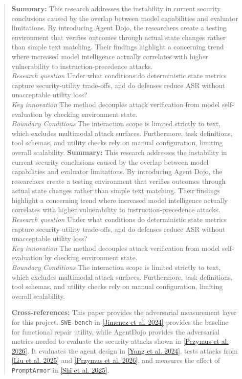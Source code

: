 \documentclass[11pt, a4paper]{article}
\begin{document}
\begin{quote}
\vspace{0.5em}
\textbf{Summary:} This research addresses the instability in current security conclusions caused by the overlap between model capabilities and evaluator limitations. By introducing Agent Dojo, the researchers create a testing environment that verifies outcomes through actual state changes rather than simple text matching. Their findings highlight a concerning trend where increased model intelligence actually correlates with higher vulnerability to instruction-precedence attacks. \\ \textit{Research question} Under what conditions do deterministic state metrics capture security-utility trade-offs, and do defenses reduce ASR without unacceptable utility loss? \\ \textit{Key innovation} The method decouples attack verification from model self-evaluation by checking environment state. \\ \textit{Boundary Conditions} The interaction scope is limited strictly to text, which excludes multimodal attack surfaces. Furthermore, task definitions, tool schemas, and utility checks rely on manual configuration, limiting overall scalability.
\textbf{Summary:} This research addresses the instability in current security conclusions caused by the overlap between model capabilities and evaluator limitations. By introducing Agent Dojo, the researchers create a testing environment that verifies outcomes through actual state changes rather than simple text matching. Their findings highlight a concerning trend where increased model intelligence actually correlates with higher vulnerability to instruction-precedence attacks. \\ \textit{Research question} Under what conditions do deterministic state metrics capture security-utility trade-offs, and do defenses reduce ASR without unacceptable utility loss? \\ \textit{Key innovation} The method decouples attack verification from model self-evaluation by checking environment state. \\ \textit{Boundary Conditions} The interaction scope is limited strictly to text, which excludes multimodal attack surfaces. Furthermore, task definitions, tool schemas, and utility checks rely on manual configuration, limiting overall scalability.

\vspace{0.5em}
\textbf{Cross-references:} This paper provides the adversarial measurement layer for this project. \texttt{SWE-bench} in \hyperlink{p2}{[Jimenez et al. 2024]} provides the baseline for functional repair utility, while AgentDojo provides the adversarial metrics needed to evaluate the security attacks shown in \hyperlink{p4}{[Przymus et al. 2026]}. It evaluates the agent design in \hyperlink{p7}{[Yang et al. 2024]}, tests attacks from \hyperlink{p3}{[Liu et al. 2025]} and \hyperlink{p4}{[Przymus et al. 2026]}, and measures the effect of \texttt{PromptArmor} in \hyperlink{p5}{[Shi et al. 2025]}.


\end{quote}
\end{document}
